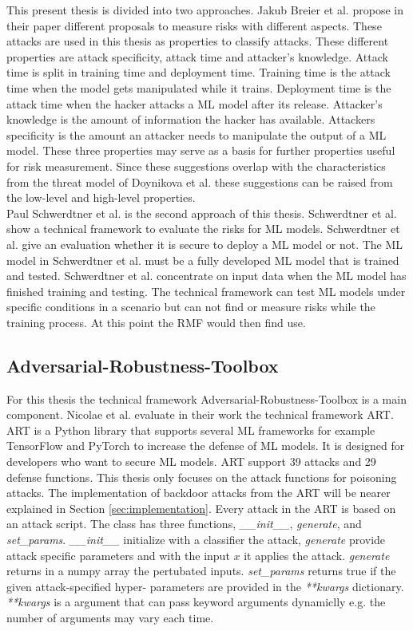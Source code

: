 This present thesis is divided into two approaches. Jakub Breier et al. \cite{DBLP:journals/corr/abs-2012-04884} propose in their paper different proposals to measure risks with different
aspects. These attacks are used in this thesis as properties to classify attacks. These different properties are attack specificity, attack time and attacker's knowledge. Attack time is
split in training time and deployment time. Training time is the attack time when the model gets manipulated while it trains. Deployment time is the attack time when the hacker attacks a
ML model after its release. Attacker's knowledge is the amount of information the hacker has available. Attackers specificity is the amount an attacker needs to manipulate the output of a
ML model. These three properties may serve as a basis for further properties useful for risk measurement. Since these suggestions overlap with the characteristics from the threat model of Doynikova et al. these suggestions can be raised from the low-level and high-level properties.\\
Paul Schwerdtner et al. \cite{DBLP:journals/corr/abs-2011-04328} is the second approach of this thesis. Schwerdtner et al. show a technical framework to evaluate the risks for ML models.
Schwerdtner et al. give an evaluation whether it is secure to deploy a ML model or not. The ML model in Schwerdtner et al. must be a fully developed ML model that is trained and tested.
Schwerdtner et al. concentrate on input data when the ML model has finished training and testing. The technical framework can test ML models under specific conditions in a scenario but can not find or measure risks while the training process. At this point the RMF would then find use.\\


\subsection{Adversarial-Robustness-Toolbox}

For this thesis the technical framework Adversarial-Robustness-Toolbox \cite{art2018} is a main component. Nicolae et al. \cite{DBLP:journals/corr/abs-1807-01069} evaluate in their work
the technical framework ART. ART is a Python library that supports several ML frameworks for example TensorFlow and PyTorch to increase the defense of ML models. It is designed for developers who want to secure ML models. ART support 39 attacks and 29 defense functions. This thesis only focuses on the attack functions for poisoning attacks. The implementation of backdoor attacks from the ART will be nearer explained in Section \ref{sec:implementation}. Every attack in the ART is based on an attack script. The class has three functions, \textit{\_\_init\_\_}, \textit{generate}, and \textit{set\_params}. \textit{\_\_init\_\_} initialize with a classifier the attack, \textit{generate} provide attack specific parameters and with the input $x$ it applies the attack. \textit{generate} returns  in a numpy array the pertubated inputs. \textit{set\_params} returns true if the given attack-specified hyper-
parameters are provided in the \textit{**kwargs} dictionary. \textit{**kwargs} is a argument that can pass keyword arguments dynamiclly e.g. the number of arguments may vary each time.


